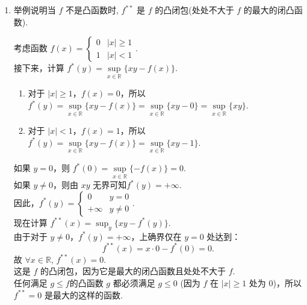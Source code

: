 \begin{enumerate}
    \item[4.]举例说明当 \(f\) 不是凸函数时, \(f^{**}\) 是 \(f\) 的凸闭包(处处不大于 \(f\) 的最大的闭凸函数).
    \begin{solution}
        考虑函数 \( f(x) = \begin{cases} 0 & |x| \geq 1 \\ 1 & |x| < 1 \end{cases} \).\\
        接下来，计算 \( f^*(y) = \underset{x\in\mathbb{R}}{\sup} \{ x y - f(x) \} \).\\ 
        \begin{enumerate}
        \item[i.] 对于 \( |x| \geq 1 \)，\( f(x) = 0 \)，所以\(\displaystyle f^*(y) = \underset{x\in\mathbb{R}}{\sup} \{ x y - f(x) \}=\underset{x\in\mathbb{R}}{\sup}\{xy-0\}=\underset{x\in\mathbb{R}}{\sup}\{xy\} \).\\
        \item[ii.] 对于 \( |x| < 1 \)，\( f(x) = 1 \)，所以\(\displaystyle f^*(y) = \underset{x\in\mathbb{R}}{\sup} \{ x y - f(x) \}=\underset{x\in\mathbb{R}}{\sup}\{xy-1\}\).\\
        \end{enumerate}
        如果 \( y = 0 \)，则 \(\displaystyle f^*(0) = \underset{x\in\mathbb{R}}{\sup} \{ -f(x) \} = 0 \).\\ 
        如果 \( y \neq 0 \)，则由 \( x y \) 无界可知\(\displaystyle f^*(y) = +\infty \).\\
        因此，\(\displaystyle f^*(y) = \begin{cases} 0 & y=0 \\ +\infty & y \neq 0 \end{cases} \).\\
        现在计算 \(\displaystyle f^{**}(x) = \sup_y \{ x y - f^*(y) \} \).\\ 
        由于对于 \( y \neq 0 \)，\( f^*(y) = +\infty \)，上确界仅在 \( y=0 \) 处达到：
        \[
        f^{**}(x) = x \cdot 0 - f^*(0) = 0.
        \]
        故 $\forall x\in\mathbb{R}$, \( f^{**}(x) = 0 \).\\ 
        这是 \( f \) 的凸闭包，因为它是最大的闭凸函数且处处不大于 \( f \).\\
        任何满足 \( g \leq f \)的凸函数 \( g \) 都必须满足 \( g \leq 0 \)  (因为 \( f \) 在 \( |x| \geq 1 \) 处为 0)，所以 \( f^{**} = 0 \) 是最大的这样的函数.
    \end{solution}
    

\end{enumerate}
